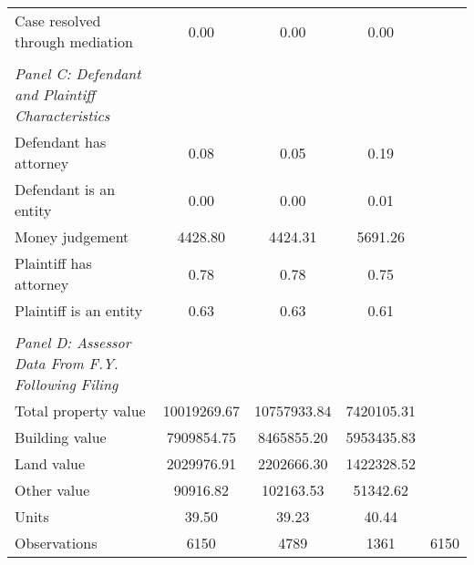 {\begin{tabular}{l*{4}{c}}
\hspace{0.25cm}Case resolved through mediation&        0.00&        0.00&        0.00&            \\
\vspace{0.1em} \\ \emph{Panel C: Defendant and Plaintiff Characteristics}&            &            &            &            \\
\hspace{0.25cm}Defendant has attorney&        0.08&        0.05&        0.19&            \\
\hspace{0.25cm}Defendant is an entity&        0.00&        0.00&        0.01&            \\
\hspace{0.25cm}Money judgement&     4428.80&     4424.31&     5691.26&            \\
\hspace{0.25cm}Plaintiff has attorney&        0.78&        0.78&        0.75&            \\
\hspace{0.25cm}Plaintiff is an entity&        0.63&        0.63&        0.61&            \\
\vspace{0.1em} \\ \emph{Panel D: Assessor Data From F.Y. Following Filing}&            &            &            &            \\
\hspace{0.25cm}Total property value& 10019269.67& 10757933.84&  7420105.31&            \\
\hspace{0.25cm}Building value&  7909854.75&  8465855.20&  5953435.83&            \\
\hspace{0.25cm}Land value&  2029976.91&  2202666.30&  1422328.52&            \\
\hspace{0.25cm}Other value&    90916.82&   102163.53&    51342.62&            \\
\hspace{0.25cm}Units&       39.50&       39.23&       40.44&            \\
\midrule
Observations        &        6150&        4789&        1361&        6150\\
\bottomrule
\end{tabular}
}
